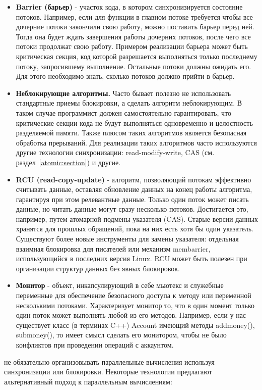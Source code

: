 {\begin{itemize}
			\item\textbf{Barrier (барьер)} - участок кода, в котором синхронизируется состояние потоков. Например, если для функции в главном потоке требуется чтобы все дочерние потоки закончили свою работу, можно поставить барьер перед ней. Тогда она будет ждать завершения работы дочерних потоков, после чего все потоки продолжат свою работу. Примером реализации барьера может быть критическая секция, код которой разрешается выполняться только последнему потоку, запросившему выполнение. Остальные потоки должны ожидать его. Для этого необходимо знать, сколько потоков должно прийти в барьер.
			\item\textbf{Неблокирующие алгоритмы.} Часто бывает полезно не использовать стандартные приемы блокировки, а сделать алгоритм неблокирующим. В таком случае программист должен самостоятельно гарантировать, что критические секции кода не будут выполняться одновременно и целостность разделяемой памяти. Также плюсом таких алгоритмов является безопасная обработка прерываний. Для реализации таких алгоритмов часто используются другие технологии синхронизации: read-modify-write, CAS (см. раздел~\ref{atomic:section}) и другие.
			\item\textbf{RCU (read-copy-update)} - алгоритм, позволяющий потокам эффективно считывать данные, оставляя обновление данных на конец работы алгоритма, гарантируя при этом релевантные данные. Только один поток может писать данные, но читать данные могут сразу несколько потоков. Достигается это, например, путем атомарной подмены указателя (CAS). Старые версии данных хранятся для прошлых обращений, пока на них есть хотя бы один указатель. Существуют более новые инструменты для замены указателя: отдельная взаимная блокировка для писателей или механизм membarrier, использующийся в последних версия Linux. RCU может быть полезен при организации структур данных без явных блокировок.
			\item\textbf{Монитор} - объект, инкапсулирующий в себе мьютекс и служебные переменные для обеспечение безопасного доступа к методу или переменной несколькими потоками. Характеризует монитор то, что в один момент только один поток может выполнять любой из его методов. Например, если у нас существует класс (в терминах C++) Account имеющий методы add\textunderscore money(),\\sub\textunderscore money(), то имеет смысл сделать его монитором, чтобы не было конфликтов при проведении операций с аккаунтом.
		\end{itemize}
		 не обязательно организовывать параллельные вычисления используя синхронизации или блокировки. Некоторые технологии предлагают альтернативный подход к параллельным вычислениям: 
}
